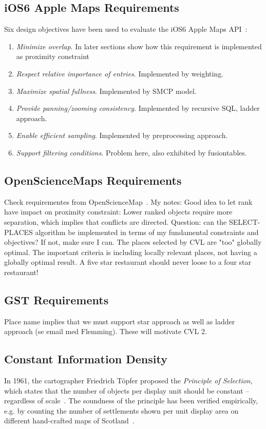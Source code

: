 \documentclass[11pt, oneside]{report}   	%
\begin{document}
\subsection{iOS6 Apple Maps Requirements}
Six design objectives have been used to evaluate the iOS6 Apple Maps API~\cite{nutanong2012multiresolution}:
\begin{enumerate}
\item \emph{Minimize overlap}. In later sections show how this requirement is implemented as proximity constraint
\item \emph{Respect relative importance of entries}. Implemented by weighting.
\item \emph{Maximize spatial fullness}. Implemented by SMCP model.
\item \emph{Provide panning/zooming consistency}. Implemented by recursive SQL, ladder approach.
\item \emph{Enable efficient sampling}. Implemented by preprocessing approach.
\item \emph{Support filtering conditions}. Problem here, also exhibited by fusiontables.
\end{enumerate}

\subsection{OpenScienceMaps Requirements}
Check requirementes from OpenScienceMap~\cite{schmid2013opensciencemap}. My notes: Good idea to let rank have impact on proximity constraint: Lower ranked objects require more separation, which implies that conflicts are directed. Question: can the SELECT-PLACES algorithm be implemented in terms of my fundamental constraints and objectives? If not, make sure I can. The places selected by CVL are "too" globally optimal. The important criteria is including locally relevant places, not having a globally optimal result. A five star restaurant should never loose to a four star restaurant!

\subsection{GST Requirements}
Place name implies that we must support star approach as well as ladder approach (se email med Flemming). These will motivate CVL 2.


\subsection{Constant Information Density}
In 1961, the cartographer Friedrich T\"{o}pfer proposed the \emph{Principle of Selection}, which states that the number of objects per display unit should be constant -- regardless of scale~\cite{topfer1966principles}. The soundness of the principle has been verified empirically, e.g. by counting the number of settlements shown per unit display area on different hand-crafted maps of Scotland~\cite{topfer1966principles}. 
\end{document}
